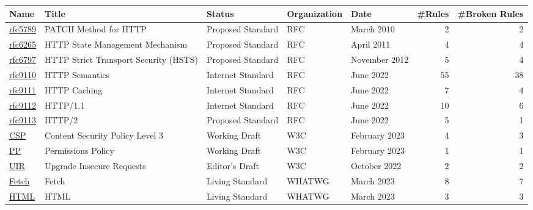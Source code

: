 \begin{tabular}{lllllrr}
\toprule
Name & Title & Status & Organization & Date & #Rules & #Broken Rules \\
\midrule
\href{https://www.rfc-editor.org/rfc/rfc5789}{rfc5789} & PATCH Method for HTTP & Proposed Standard & RFC & March 2010 & 2 & 2 \\
\href{https://www.rfc-editor.org/rfc/rfc6265}{rfc6265} & HTTP State Management Mechanism & Proposed Standard & RFC & April 2011 & 4 & 4 \\
\href{https://www.rfc-editor.org/rfc/rfc6797}{rfc6797} & HTTP Strict Transport Security (HSTS) & Proposed Standard & RFC & November 2012 & 5 & 4 \\
\href{https://www.rfc-editor.org/rfc/rfc9110}{rfc9110} & HTTP Semantics & Internet Standard & RFC & June 2022 & 55 & 38 \\
\href{https://www.rfc-editor.org/rfc/rfc9111}{rfc9111} & HTTP Caching & Internet Standard & RFC & June 2022 & 7 & 4 \\
\href{https://www.rfc-editor.org/rfc/rfc9112}{rfc9112} & HTTP/1.1 & Internet Standard & RFC & June 2022 & 10 & 6 \\
\href{https://www.rfc-editor.org/rfc/rfc9113}{rfc9113} & HTTP/2 & Proposed Standard & RFC & June 2022 & 5 & 1 \\
\href{https://www.w3.org/TR/2023/WD-CSP3-20230220/}{CSP} & Content Security Policy Level 3 & Working Draft & W3C & February 2023 & 4 & 3 \\
\href{https://www.w3.org/TR/2023/WD-permissions-policy-1-20230322/}{PP} & Permissions Policy & Working Draft & W3C & February 2023 & 1 & 1 \\
\href{https://w3c.github.io/webappsec-upgrade-insecure-requests/}{UIR} & Upgrade Insecure Requests & Editor's Draft & W3C & October 2022 & 2 & 2 \\
\href{https://fetch.spec.whatwg.org/commit-snapshots/8f109835dcff90d19caed4b551a0da32d9d0f57e/}{Fetch} & Fetch & Living Standard & WHATWG & March 2023 & 8 & 7 \\
\href{https://html.spec.whatwg.org/commit-snapshots/578def68a9735a1e36610a6789245ddfc13d24e0/}{HTML} & HTML & Living Standard & WHATWG & March 2023 & 3 & 3 \\
\bottomrule
\end{tabular}
